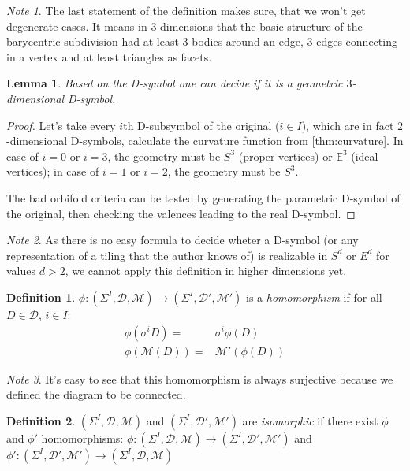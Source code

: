 \documentclass[12pt,a4paper]{article}
\theoremstyle{plain}%
\newtheorem{lem}[thm]{Lemma}
\theoremstyle{definition}
\newtheorem{defn}{Definition}[section]
\theoremstyle{remark}
\newtheorem*{note}{Note}
\begin{document}
\begin{note}
  The last statement of the definition makes sure, that we won't get degenerate
  cases. It means in $3$ dimensions that the basic structure of the barycentric
  subdivision had at least 3 bodies around an edge, 3 edges connecting in a
  vertex and at least triangles as facets.
\end{note}

\begin{lem}
  Based on the D-symbol one can decide if it is a geometric $3$-dimensional
  D-symbol.
\end{lem}

\begin{proof}
  Let's take every $i$th D-subsymbol of the original ($i\in I$), which are in
  fact $2$-dimensional D-symbols, calculate the curvature function from
  \ref{thm:curvature}. In case of $i=0$ or $i=3$, the geometry must be $S^3$
  (proper vertices) or $\mathbb{E}^3$ (ideal vertices); in case of $i=1$ or $i=2$, the
  geometry must be $S^3$.

  The bad orbifold criteria can be tested by generating the parametric D-symbol
  of the original, then checking the valences leading to the real D-symbol.
\end{proof}

\begin{note}
  As there is no easy formula to decide wheter a D-symbol (or any representation
  of a tiling that the author knows of) is realizable in $S^d$ or $E^d$ for
  values $d>2$, we cannot apply this definition in higher dimensions yet.
\end{note}

\begin{defn}
  $\phi: (\Sigma^I,\mathcal{D},\mathcal{M}) \rightarrow
  (\Sigma^I,\mathcal{D}',\mathcal{M}')$ is a {\em homomorphism} if for all $D\in
  \mathcal{D}$, $i \in I$:
  \begin{align}
    \phi(\sigma^iD)= & \sigma^i\phi(D) \\
    \phi(\mathcal{M}(D))= & \mathcal{M}'(\phi(D))
  \end{align}
\end{defn}

\begin{note}
  It's easy to see that this homomorphism is always surjective because we
  defined the diagram to be connected.
\end{note}

\begin{defn}
  $(\Sigma^I,\mathcal{D},\mathcal{M})$ and
  $(\Sigma^I,\mathcal{D}',\mathcal{M}')$ are {\em isomorphic} if there exist $\phi$ and
  $\phi'$ homomorphisms: $\phi: (\Sigma^I,\mathcal{D},\mathcal{M}) \rightarrow
  (\Sigma^I,\mathcal{D}',\mathcal{M}')$ and $\phi':
  (\Sigma^I,\mathcal{D}',\mathcal{M}') \rightarrow
  (\Sigma^I,\mathcal{D},\mathcal{M})$
\end{defn}
\end{document}
